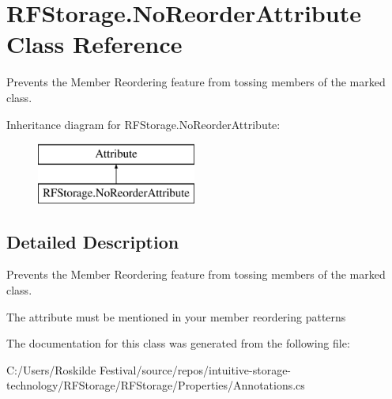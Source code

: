 \hypertarget{class_r_f_storage_1_1_no_reorder_attribute}{}\section{R\+F\+Storage.\+No\+Reorder\+Attribute Class Reference}
\label{class_r_f_storage_1_1_no_reorder_attribute}


Prevents the Member Reordering feature from tossing members of the marked class.  


Inheritance diagram for R\+F\+Storage.\+No\+Reorder\+Attribute\+:\begin{figure}[H]
\begin{center}
\leavevmode
\includegraphics[height=2.000000cm]{class_r_f_storage_1_1_no_reorder_attribute}
\end{center}
\end{figure}


\subsection{Detailed Description}
Prevents the Member Reordering feature from tossing members of the marked class. 

The attribute must be mentioned in your member reordering patterns 

The documentation for this class was generated from the following file\+:\begin{DoxyCompactItemize}
\item 
C\+:/\+Users/\+Roskilde Festival/source/repos/intuitive-\/storage-\/technology/\+R\+F\+Storage/\+R\+F\+Storage/\+Properties/Annotations.\+cs\end{DoxyCompactItemize}
